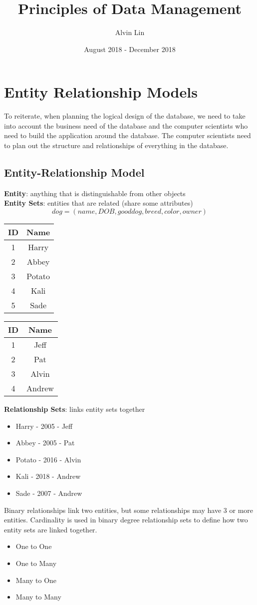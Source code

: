 \documentclass{math}
\title{Principles of Data Management}
\author{Alvin Lin}
\date{August 2018 - December 2018}
\begin{document}
\maketitle

\section*{Entity Relationship Models}
To reiterate, when planning the logical design of the database, we need to take
into account the business need of the database and the computer scientists who
need to build the application around the database. The computer scientists
need to plan out the structure and relationships of everything in the database.

\subsection*{Entity-Relationship Model}
\textbf{Entity}: anything that is distinguishable from other objects \\
\textbf{Entity Sets}: entities that are related (share some attributes)
\[ dog = (name,DOB,gooddog,breed,color,owner) \]
\begin{center}
  \begin{tabular}{|c|c|}
    \hline
    ID & Name \\
    \hline
    1 & Harry \\
    2 & Abbey \\
    3 & Potato \\
    4 & Kali \\
    5 & Sade \\
    \hline
  \end{tabular}
  \begin{tabular}{|c|c|}
    \hline
    ID & Name \\
    \hline
    1 & Jeff \\
    2 & Pat \\
    3 & Alvin \\
    4 & Andrew \\
    \hline
  \end{tabular}
\end{center}
\textbf{Relationship Sets}: links entity sets together
\begin{itemize}
  \item Harry - 2005 - Jeff
  \item Abbey - 2005 - Pat
  \item Potato - 2016 - Alvin
  \item Kali - 2018 - Andrew
  \item Sade - 2007 - Andrew
\end{itemize}
Binary relationships link two entities, but some relationships may have 3 or
more entities. Cardinality is used in binary degree relationship sets to define
how two entity sets are linked together.
\begin{itemize}
  \item One to One
  \item One to Many
  \item Many to One
  \item Many to Many
\end{itemize}
\end{document}
